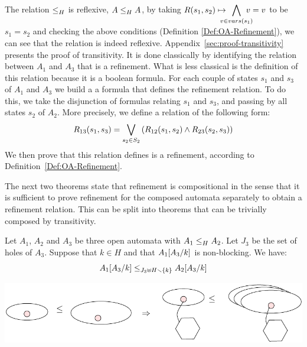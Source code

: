 \documentclass[runningheads]{llncs}
\begin{document}
The relation  \(\wrel{}{}{H}\) is reflexive,  \(\wrel{A}{A}{H}\),  by taking $R\mpar{s_1, s_2} \mapsto \displaystyle\bigwedge_\subbox{v \in vars(s_1)} {v=v}$ to be $s_1= s_2$  and checking the above conditions (Definition \ref{Def:OA-Refinement}), we can see that the relation is indeed reflexive.
%
Appendix~\ref{sec:proof-transitivity} presents the proof of transitivity. It is done classically by identifying the relation between $A_1$ and $A_3$ that is a refinement. What is less classical is the definition of this relation because it is a boolean formula. For each couple of states  $s_1$ and $s_3$ of $A_1$ and $A_3$ we build a a formula that defines the refinement relation. To do this, we take the disjunction of formulas relating $s_1$ and $s_3$, and passing by all states $s_2$ of $A_2$. More precisely, we define a relation of the following form:
  \[R_{13}(s_1,s_3)=\bigvee_{s_2\in S_2}\mpar{R_{12}(s_1,s_2) \land R_{23}(s_2,s_3) } \]
We then prove that this relation defines is a refinement, according to Definition~\ref{Def:OA-Refinement}.


The next two theorems state that refinement is compositional in the sense that it is sufficient to prove refinement for the composed automata separately to obtain a refinement relation. This can be split into theorems that can be trivially composed by transitivity.
%
%

\begin{theorem}\label{thm:ContextRefinement}
Let $A_1$, $A_2$ and $A_3$ be three open automata with $\wrel{A_1}{A_2}{H}$. 
Let $J_3$ be the set of holes of $A_3$.
Suppose that \(k \in H\) and that \(A_1\subst{A_3}{k}\) is non-blocking.
We have: \[\wrel{A_1\subst{A_3}{k}}{A_2\subst{A_3}{k}}{J_3 \uplus H \setminus \mbrc{k}}\]
\end{theorem}


\begin{center}
\includegraphics[scale=0.7]{Figures/Theorem2}
\end{center}
\end{document}
